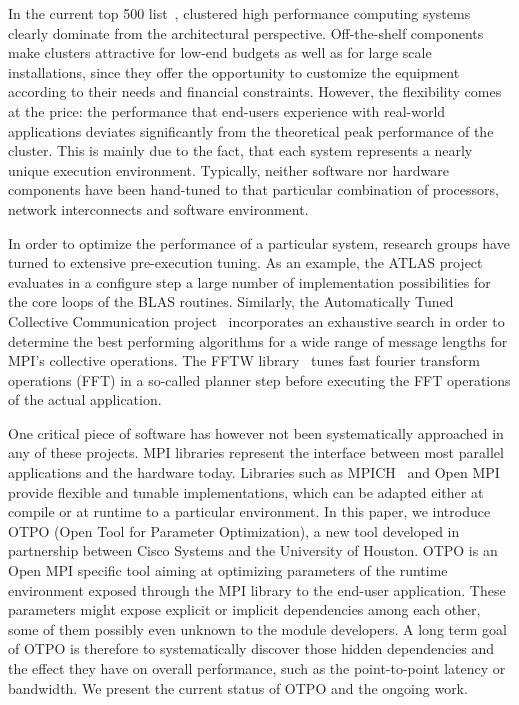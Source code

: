 In the current top 500 list~\cite{top500}, clustered high performance computing systems clearly dominate from the architectural perspective. Off-the-shelf components make clusters attractive for low-end budgets as well as for large scale installations, since they offer the opportunity to customize the equipment according to their needs and financial constraints. However, the flexibility comes at the price: the performance that end-users experience with real-world applications deviates significantly from the theoretical peak performance of the cluster. This is mainly due to the fact, that each system represents a nearly unique execution environment. Typically, neither software nor hardware components have been hand-tuned to that particular combination of processors, network interconnects and software environment. %

In order to optimize the performance of a particular system, research groups have turned to extensive pre-execution tuning. As an example, the ATLAS project~\cite{atlas} evaluates in a configure step a large number of implementation possibilities for the core loops of the BLAS routines. Similarly, the Automatically Tuned Collective Communication project~\cite{pjesa:cluster} incorporates an exhaustive search in order to determine the best performing algorithms for a wide range of message lengths for MPI's collective operations.  The FFTW library~\cite{fftw} tunes fast fourier transform operations (FFT) in a so-called planner step before executing the FFT operations of the actual application.

One critical piece of software has however not been systematically approached in any of these projects. MPI libraries represent the interface between most parallel applications and the hardware today. Libraries such as MPICH~\cite{Gropp:1996:HPI} and Open MPI~\cite{gabriel:ompi} provide flexible and tunable implementations, which can be adapted either at compile or at runtime to a particular environment. In this paper, we introduce OTPO (Open Tool for Parameter Optimization), a new tool developed in partnership between Cisco Systems and the University of Houston. OTPO is an Open MPI specific tool aiming at optimizing parameters of the runtime environment exposed through the MPI library to the end-user application. These parameters might expose explicit or implicit dependencies among each other, some of them possibly even unknown to the module developers. A long term goal of OTPO is therefore to systematically discover those hidden dependencies and the effect they have on overall performance, such as the point-to-point latency or bandwidth. We present the current status of OTPO and the ongoing work.

